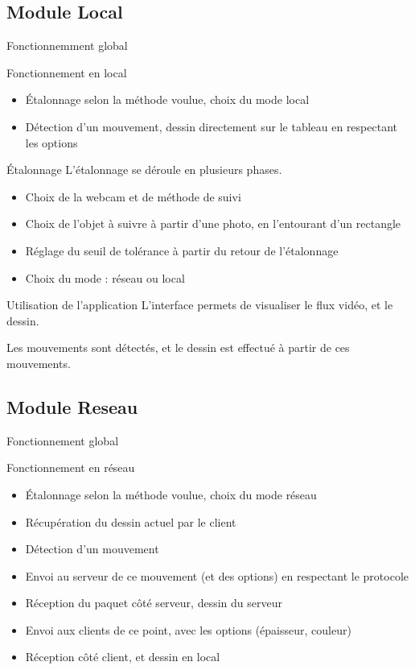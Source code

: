 \documentclass{beamer}
\begin{document}
	\subsection{Module Local}
		\begin{frame}{Fonctionnemment global}
			\begin{block}{Fonctionnement en local}
				\begin{itemize}
				\item Étalonnage selon la méthode voulue, choix du mode local
				\item Détection d'un mouvement, dessin directement sur le tableau en respectant les options
				\end{itemize}
			\end{block}
		\end{frame}
		
		\begin{frame}{Étalonnage}
			L'étalonnage se déroule en plusieurs phases.
			\begin{itemize}
			\item Choix de la webcam et de méthode de suivi
			\item Choix de l'objet à suivre à partir d'une photo, en l'entourant d'un rectangle
			\item Réglage du seuil de tolérance à partir du retour de l'étalonnage
			\item Choix du mode : réseau ou local
			\end{itemize}
		\end{frame}
		
		\begin{frame}{Utilisation de l'application}
		L'interface permets de visualiser le flux vidéo, et le dessin.
		
		Les mouvements sont détectés, et le dessin est effectué à partir de ces mouvements.
		\end{frame}

	\subsection{Module Reseau}
		\begin{frame}{Fonctionnement global}
			\begin{block}{Fonctionnement en réseau}
				\begin{itemize}
				\item Étalonnage selon la méthode voulue, choix du mode réseau
				\item Récupération du dessin actuel par le client
				\item Détection d'un mouvement
				\item Envoi au serveur de ce mouvement (et des options) en respectant le protocole
				\item Réception du paquet côté serveur, dessin du serveur
				\item Envoi aux clients de ce point, avec les options (épaisseur, couleur)
				\item Réception côté client, et dessin en local
				\end{itemize}
			\end{block}
		\end{frame}
		
\end{document}
